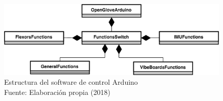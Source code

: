 \begin{figure}[H]
  \begin{center} 
   	\includegraphics[width=1.0\textwidth]{images/chapter04/OpenGlove-Architecture-Arduino-Software.png} 
    \caption[Estructura del software de control Arduino]{Estructura del software de control Arduino \\Fuente: Elaboración propia (2018)}
    \label{fig:arduino-software-control}
  \end{center}
\end{figure}



